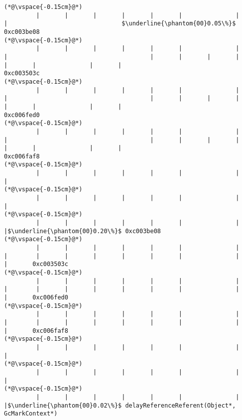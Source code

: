 \begin{lstlisting}[caption=NewDirectByteBuffer, label=profile:C2JNewDirectBuffer-512, numberbychapter=true, frame=lines, float, floatplacement=t]
(*@\vspace{-0.15cm}@*)
         |       |       |       |       |       |               |       |                                $\underline{\phantom{00}0.05\%}$ 0xc003be08
(*@\vspace{-0.15cm}@*)
         |       |       |       |       |       |               |       |                                        |       |       |       |       |       |               |       |                                       0xc003503c
(*@\vspace{-0.15cm}@*)
         |       |       |       |       |       |               |       |                                        |       |       |       |       |       |               |       |                                       0xc006fed0
(*@\vspace{-0.15cm}@*)
         |       |       |       |       |       |               |       |                                        |       |       |       |       |       |               |       |                                       0xc006faf8
(*@\vspace{-0.15cm}@*)
         |       |       |       |       |       |               |       |
(*@\vspace{-0.15cm}@*)
         |       |       |       |       |       |               |       |
(*@\vspace{-0.15cm}@*)
         |       |       |       |       |       |               |       |$\underline{\phantom{00}0.20\%}$ 0xc003be08
(*@\vspace{-0.15cm}@*)
         |       |       |       |       |       |               |       |        |       |       |       |       |       |               |       |       0xc003503c
(*@\vspace{-0.15cm}@*)
         |       |       |       |       |       |               |       |        |       |       |       |       |       |               |       |       0xc006fed0
(*@\vspace{-0.15cm}@*)
         |       |       |       |       |       |               |       |        |       |       |       |       |       |               |       |       0xc006faf8
(*@\vspace{-0.15cm}@*)
         |       |       |       |       |       |               |       |
(*@\vspace{-0.15cm}@*)
         |       |       |       |       |       |               |       |
(*@\vspace{-0.15cm}@*)
         |       |       |       |       |       |               |       |$\underline{\phantom{00}0.02\%}$ delayReferenceReferent(Object*, GcMarkContext*)

\end{lstlisting}
